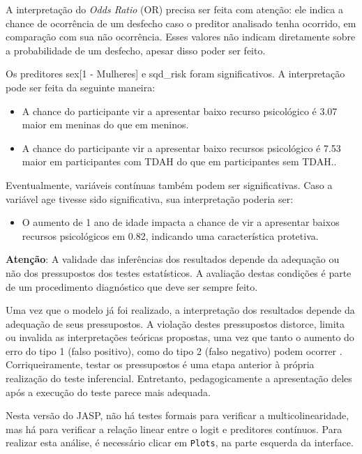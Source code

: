 \documentclass[
]{book}
\providecommand{\tightlist}{%
  \setlength{\itemsep}{0pt}\setlength{\parskip}{0pt}}
\begin{document}
A interpretação do \emph{Odds Ratio} (OR) precisa ser feita com atenção: ele indica a chance de ocorrência de um desfecho caso o preditor analisado tenha ocorrido, em comparação com sua não ocorrência. Esses valores não indicam diretamente sobre a probabilidade de um desfecho, apesar disso poder ser feito.

Os preditores sex{[}1 - Mulheres{]} e sqd\_risk foram significativos. A interpretação pode ser feita da seguinte maneira:

\begin{itemize}
\tightlist
\item
  A chance do participante vir a apresentar baixo recurso psicológico é 3.07 maior em meninas do que em meninos.
\item
  A chance do participante vir a apresentar baixo recursos psicológico é 7.53 maior em participantes com TDAH do que em participantes sem TDAH..
\end{itemize}

Eventualmente, variáveis contínuas também podem ser significativas. Caso a variável age tivesse sido significativa, sua interpretação poderia ser:

\begin{itemize}
\tightlist
\item
  O aumento de 1 ano de idade impacta a chance de vir a apresentar baixos recursos psicológicos em 0.82, indicando uma característica protetiva.
\end{itemize}

\textbf{Atenção}: A validade das inferências dos resultados depende da adequação ou não dos pressupostos dos testes estatísticos. A avaliação destas condições é parte de um procedimento diagnóstico que deve ser sempre feito.

Uma vez que o modelo já foi realizado, a interpretação dos resultados depende da adequação de seus pressupostos. A violação destes pressupostos distorce, limita ou invalida as interpretações teóricas propostas, uma vez que tanto o aumento do erro do tipo 1 (falso positivo), como do tipo 2 (falso negativo) podem ocorrer \citep{Lix1996, Barker2015, Ernst2017}. Corriqueiramente, testar os pressupostos é uma etapa anterior à própria realização do teste inferencial. Entretanto, pedagogicamente a apresentação deles após a execução do teste parece mais adequada.

Nesta versão do JASP, não há testes formais para verificar a multicolinearidade, mas há para verificar a relação linear entre o logit e preditores contínuos. Para realizar esta análise, é necessário clicar em \texttt{Plots}, na parte esquerda da interface.
\end{document}
